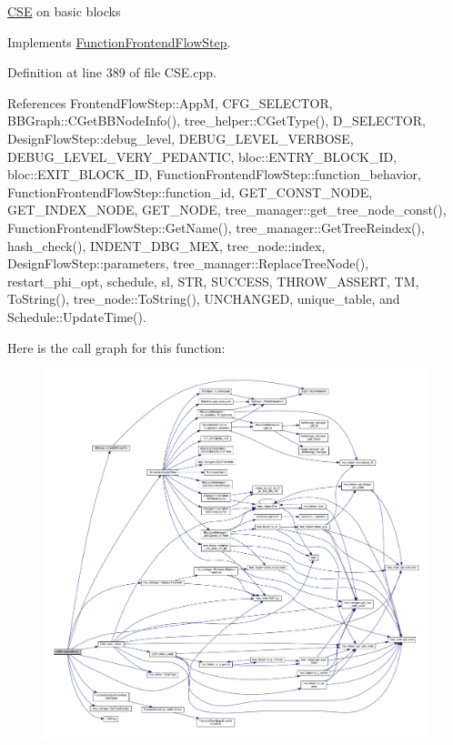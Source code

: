 \hyperlink{classCSE}{C\+SE} on basic blocks 

Implements \hyperlink{classFunctionFrontendFlowStep_a00612f7fb9eabbbc8ee7e39d34e5ac68}{Function\+Frontend\+Flow\+Step}.



Definition at line 389 of file C\+S\+E.\+cpp.



References Frontend\+Flow\+Step\+::\+AppM, C\+F\+G\+\_\+\+S\+E\+L\+E\+C\+T\+OR, B\+B\+Graph\+::\+C\+Get\+B\+B\+Node\+Info(), tree\+\_\+helper\+::\+C\+Get\+Type(), D\+\_\+\+S\+E\+L\+E\+C\+T\+OR, Design\+Flow\+Step\+::debug\+\_\+level, D\+E\+B\+U\+G\+\_\+\+L\+E\+V\+E\+L\+\_\+\+V\+E\+R\+B\+O\+SE, D\+E\+B\+U\+G\+\_\+\+L\+E\+V\+E\+L\+\_\+\+V\+E\+R\+Y\+\_\+\+P\+E\+D\+A\+N\+T\+IC, bloc\+::\+E\+N\+T\+R\+Y\+\_\+\+B\+L\+O\+C\+K\+\_\+\+ID, bloc\+::\+E\+X\+I\+T\+\_\+\+B\+L\+O\+C\+K\+\_\+\+ID, Function\+Frontend\+Flow\+Step\+::function\+\_\+behavior, Function\+Frontend\+Flow\+Step\+::function\+\_\+id, G\+E\+T\+\_\+\+C\+O\+N\+S\+T\+\_\+\+N\+O\+DE, G\+E\+T\+\_\+\+I\+N\+D\+E\+X\+\_\+\+N\+O\+DE, G\+E\+T\+\_\+\+N\+O\+DE, tree\+\_\+manager\+::get\+\_\+tree\+\_\+node\+\_\+const(), Function\+Frontend\+Flow\+Step\+::\+Get\+Name(), tree\+\_\+manager\+::\+Get\+Tree\+Reindex(), hash\+\_\+check(), I\+N\+D\+E\+N\+T\+\_\+\+D\+B\+G\+\_\+\+M\+EX, tree\+\_\+node\+::index, Design\+Flow\+Step\+::parameters, tree\+\_\+manager\+::\+Replace\+Tree\+Node(), restart\+\_\+phi\+\_\+opt, schedule, sl, S\+TR, S\+U\+C\+C\+E\+SS, T\+H\+R\+O\+W\+\_\+\+A\+S\+S\+E\+RT, TM, To\+String(), tree\+\_\+node\+::\+To\+String(), U\+N\+C\+H\+A\+N\+G\+ED, unique\+\_\+table, and Schedule\+::\+Update\+Time().

Here is the call graph for this function\+:
\nopagebreak
\begin{figure}[H]
\begin{center}
\leavevmode
\includegraphics[width=350pt]{d1/d73/classCSE_adbf292294aa82603ea2189ddf1293508_cgraph}
\end{center}
\end{figure}



